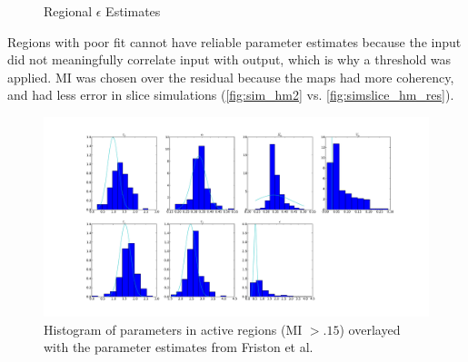 \begin{figure}[H]
\centering
{}
\caption{Regional $\epsilon$ Estimates}
\label{fig:pmap6}
\end{figure}

Regions with poor fit cannot have reliable parameter estimates because the input did not meaningfully
correlate input with output, which is why a threshold was applied.
\ac{MI} was chosen over the residual because the
maps had more coherency, and had less error in slice simulations (\autoref{fig:sim_hm2} vs.
\autoref{fig:simslice_hm_res}).

\begin{figure}
\centering
\includegraphics[clip=true,trim=6cm 1cm 5cm 1cm,width=\textwidth]{images/realhist}
\caption{Histogram of parameters in active regions (\acs{MI} $> .15$) overlayed
with the parameter estimates from Friston et al. \cite{Friston2002b}}
\label{fig:realhist}
\end{figure}

